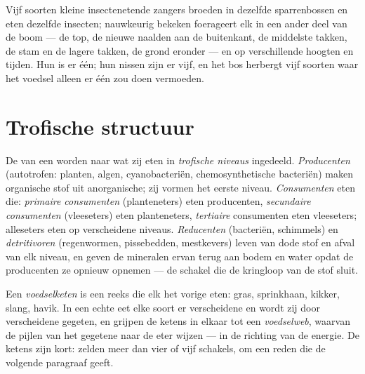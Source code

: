 \begin{example}\label{ex:b1:ecosystem-organization:warblers}
Vijf soorten kleine insectenetende zangers broeden in dezelfde sparrenbossen
en eten dezelfde insecten; nauwkeurig bekeken foerageert elk in een ander
deel van de boom --- de top, de nieuwe naalden aan de buitenkant, de
middelste takken, de stam en de lagere takken, de grond eronder --- en op
verschillende hoogten en tijden. Hun  is er één; hun nissen zijn
er vijf, en het bos herbergt vijf soorten waar het voedsel alleen er één zou
doen vermoeden.
\end{example}

\section{Trofische structuur}

\begin{definition}\label{def:b1:ecosystem-organization:trophic}
De  van een  worden naar wat zij eten in \emph{trofische
niveaus} ingedeeld. \emph{Producenten} (autotrofen: planten, algen,
cyanobacteriën, chemosynthetische bacteriën) maken organische stof uit
anorganische; zij vormen het eerste niveau. \emph{Consumenten} eten die:
\emph{primaire consumenten} (planteneters) eten producenten,
\emph{secundaire consumenten} (vleeseters) eten planteneters,
\emph{tertiaire} consumenten eten vleeseters; alleseters eten op
verscheidene niveaus. \emph{Reducenten} (bacteriën, schimmels) en
\emph{detritivoren} (regenwormen, pissebedden, mestkevers) leven van dode
stof en afval van elk niveau, en geven de mineralen ervan terug aan bodem en
water opdat de producenten ze opnieuw opnemen --- de schakel die de
kringloop van de stof sluit.
\end{definition}

\begin{definition}\label{def:b1:ecosystem-organization:foodweb}
Een \emph{voedselketen} is een reeks  die elk het vorige eten:
gras, sprinkhaan, kikker, slang, havik. In een echte  eet
elke soort er verscheidene en wordt zij door verscheidene gegeten, en grijpen
de ketens in elkaar tot een \emph{voedselweb}, waarvan de pijlen van het
gegetene naar de eter wijzen --- in de richting van de energie. De ketens
zijn kort: zelden meer dan vier of vijf schakels, om een reden die de
volgende paragraaf geeft.
\end{definition}

